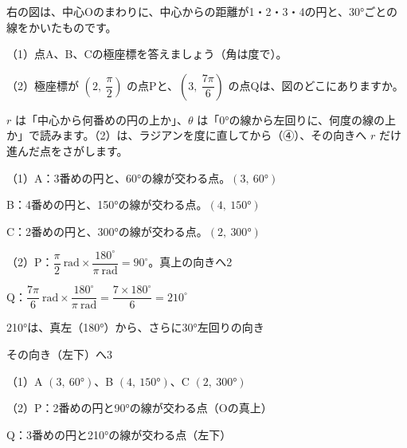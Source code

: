 \begin{reidai}
\noindent\begin{minipage}[t]{0.5\linewidth}
右の図は、中心Oのまわりに、中心からの距離が1・2・3・4の円と、30°ごとの線をかいたものです。\par
（1）\nobreak 点A、B、Cの極座標を答えましょう（角は度で）。\par
（2）\nobreak 極座標が $\left(2,\ \dfrac{\pi}{2}\right)$ の点Pと、$\left(3,\ \dfrac{7\pi}{6}\right)$ の点Qは、図のどこにありますか。
\end{minipage}\hfill
\begin{minipage}[t]{0.46\linewidth}\vspace{0pt}\centering
{}
\end{minipage}\par
\kangaekata $r$ は「中心から何番めの円の上か」、$\theta$ は「0°の線から左回りに、何度の線の上か」で読みます。（2）は、ラジアンを度に直してから（④）、その向きへ $r$ だけ進んだ点をさがします。\par
\shiki （1）A：3番めの円と、60°の線が交わる点。$(3,\ 60°)$\par
\hspace*{4.3\zw}B：4番めの円と、150°の線が交わる点。$(4,\ 150°)$\par
\hspace*{4.3\zw}C：2番めの円と、300°の線が交わる点。$(2,\ 300°)$\par
\hspace*{2.6\zw}（2）P：$\dfrac{\pi}{2}\ \text{rad}\times\dfrac{180^{\circ}}{\pi\ \text{rad}}=90^{\circ}$。真上の向きへ2\par
\hspace*{4.3\zw}Q：$\dfrac{7\pi}{6}\ \text{rad}\times\dfrac{180^{\circ}}{\pi\ \text{rad}}=\dfrac{7\times180^{\circ}}{6}=210^{\circ}$\par
\hspace*{4.3\zw}210°は、真左（180°）から、さらに30°左回りの向き\par
\hspace*{4.3\zw}その向き（左下）へ3\par
\kotae （1）\nobreak A $(3,\ 60°)$、B $(4,\ 150°)$、C $(2,\ 300°)$\par
\hspace*{2.6\zw}（2）\nobreak P：2番めの円と90°の線が交わる点（Oの真上）\par
\hspace*{4.3\zw}Q：3番めの円と210°の線が交わる点（左下）
\end{reidai}

